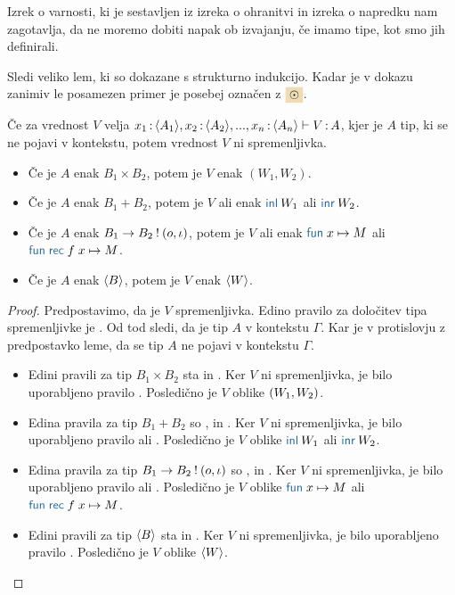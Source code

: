 Izrek o varnosti, ki je sestavljen iz izreka o ohranitvi in izreka o napredku nam zagotavlja, da ne moremo dobiti napak ob izvajanju, če imamo tipe, kot smo jih definirali.

Sledi veliko lem, ki so dokazane s strukturno indukcijo. Kadar je v dokazu zanimiv le posamezen primer je posebej označen z $\sitem$.


\begin{lema}\label{lem:ni-spremenljivka}
	Če za vrednost $V$ velja $x_1 \mathinner{:} \langle A_1 \rangle, x_2 \mathinner{:} \langle A_2 \rangle, ..., x_n \mathinner{:} \langle A_n \rangle \vdash V \mathinner{:} A$, kjer je $A$ tip, ki se ne pojavi v kontekstu, potem vrednost $V$ ni spremenljivka.
	\begin{itemize}
		\item Če je $A$ enak $B_1 \times B_2$, potem je $V$ enak $(W_1,W_2)$.
		\item Če je $A$ enak $B_1 + B_2$, potem je $V$ ali enak $\tminl{W_1}$ ali $\tminr{W_2}$.
		\item Če je $A$ enak $B_1 \to B_2 \mathbin{!} (o, \iota)$, potem je $V$ ali enak $\tmfunano{x}{M}$ ali $\tmfunrecano{f}{x}{M}$.
		\item Če je $A$ enak $\langle B \rangle$, potem je $V$ enak $\langle W \rangle$.
	\end{itemize}
\end{lema}

\begin{proof}
	Predpostavimo, da je $V$ spremenljivka. Edino pravilo za določitev tipa spremenljivke je .
	Od tod sledi, da je tip $A$ v kontekstu $\Gamma$. Kar je v protislovju z predpostavko leme, da se tip $A$ ne pojavi v kontekstu $\Gamma$.
	\begin{itemize}
		\item Edini pravili za tip $B_1 \times B_2$ sta  in .
		Ker $V$ ni spremenljivka, je bilo uporabljeno pravilo .
		Posledično je $V$ oblike $( W_1 , W_2 )$.
		
		\item Edina pravila za tip $B_1 + B_2$ so ,  in .
		Ker $V$ ni spremenljivka, je bilo uporabljeno pravilo  ali .
		Posledično je $V$ oblike $\tminl{W_1}$ ali $\tminr{W_2}$.
		
		\item Edina pravila za tip $B_1 \to B_2 \mathbin{!} (o, \iota)$ so ,  in .
		Ker $V$ ni spremenljivka, je bilo uporabljeno pravilo  ali .
		Posledično je $V$ oblike $\tmfunano{x}{M}$ ali $\tmfunrecano{f}{x}{M}$.
		
		\item Edini pravili za tip $\langle B \rangle$ sta  in .
		Ker $V$ ni spremenljivka, je bilo uporabljeno pravilo .
		Posledično je $V$ oblike $\langle W \rangle$.
	\end{itemize}
\end{proof}


